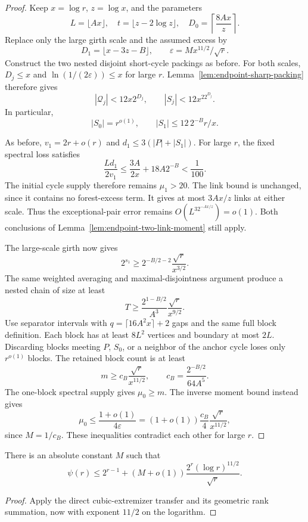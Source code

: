 \begin{proof}
Keep $x=\log r$, $z=\log x$, and the parameters
\[
 L=\lfloor Ax\rfloor,\quad
 t=\lfloor z-2\log z\rfloor,\quad
 D_0=\left\lceil\frac{8Ax}{z}\right\rceil.
\]
Replace only the large girth scale and the assumed excess by
\[
 D_1=\lfloor x-3z-B\rfloor,
 \qquad \varepsilon=Mx^{11/2}/\sqrt r.
\]
Construct the two nested disjoint short-cycle packings as before.
For both scales, $D_j\le x$ and $\ln(1/(2\varepsilon))\le x$ for large $r$.
Lemma~\ref{lem:endpoint-sharp-packing} therefore gives
\[
 |\mathcal Q_j|<12x2^{D_j},\qquad
 |S_j|<12x^22^{D_j}.
\]
In particular,
\[
 |S_0|=r^{o(1)},\qquad
 |S_1|\le12\,2^{-B}r/x.
\]

As before, $v_1=2r+o(r)$ and $d_1\le3(|P|+|S_1|)$.
For large $r$, the fixed spectral loss satisfies
\[
 \frac{Ld_1}{2v_1}
 \le\frac{3A}{2x}+18A2^{-B}<\frac1{100}.
\]
The initial cycle supply therefore remains $\mu_1>20$.
The link bound is unchanged, since it contains no forest-excess term.
It gives at most $3Ax/z$ links at either scale.
Thus the exceptional-pair error remains $O(L^32^{-Ax/z})=o(1)$.
Both conclusions of Lemma~\ref{lem:endpoint-two-link-moment} still apply.

The large-scale girth now gives
\[
 2^{s_1}\ge2^{-B/2-2}\frac{\sqrt r}{x^{3/2}}.
\]
The same weighted averaging and maximal-disjointness argument produce a nested chain of size at least
\[
 T\ge\frac{2^{1-B/2}}{A^3}\frac{\sqrt r}{x^{9/2}}.
\]
Use separator intervals with $q=\lceil16A^2x\rceil+2$ gaps and the same full block definition.
Each block has at least $8L^2$ vertices and boundary at most $2L$.
Discarding blocks meeting $P$, $S_0$, or a neighbor of the anchor cycle loses only $r^{o(1)}$ blocks.
The retained block count is at least
\[
 m\ge c_B\frac{\sqrt r}{x^{11/2}},
 \qquad c_B=\frac{2^{-B/2}}{64A^5}.
\]
The one-block spectral supply gives $\mu_0\ge m$.
The inverse moment bound instead gives
\[
 \mu_0\le\frac{1+o(1)}{4\varepsilon}
 =(1+o(1))\frac{c_B}{4}\frac{\sqrt r}{x^{11/2}},
\]
since $M=1/c_B$.
These inequalities contradict each other for large $r$.
\end{proof}

\begin{corollary}
\label{cor:parallel-links-log-five-half-cycles}
There is an absolute constant $M$ such that
\[
 \psi(r)
 \le2^{r-1}+(M+o(1))\frac{2^r(\log r)^{11/2}}{\sqrt r}.
\]
\end{corollary}

\begin{proof}
Apply the direct cubic-extremizer transfer and its geometric rank summation, now with exponent $11/2$ on the logarithm.
\end{proof}
